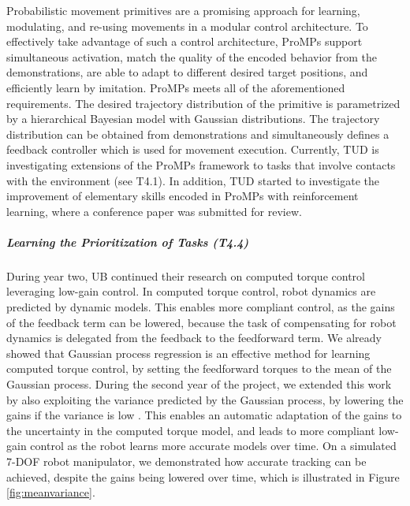 Probabilistic movement primitives are a promising approach for learning,
modulating, and re-using movements in a modular control architecture.  To
effectively take advantage of such a control architecture, ProMPs support
simultaneous activation, match the quality of the encoded behavior from the
demonstrations, are able to adapt to different desired target positions, and
efficiently learn by imitation. ProMPs meets all of the aforementioned
requirements.  The desired trajectory distribution of the
primitive is parametrized by a hierarchical Bayesian model with Gaussian distributions. The
trajectory distribution can be obtained from demonstrations and 
simultaneously defines a feedback controller which is used for movement
execution. Currently, TUD is investigating extensions of the ProMPs framework 
to tasks that involve 
contacts with the environment (see T4.1). In addition, TUD started to investigate the improvement of elementary skills encoded in ProMPs with 
reinforcement learning, where a conference paper was submitted for review.


\subparagraph{Learning the Prioritization of Tasks (T4.4)}%

During year two, UB continued their research on computed torque control leveraging low-gain control. 
In computed torque control, robot dynamics are predicted by dynamic models.
This enables more compliant control, as the gains of the feedback term can be
lowered, because the task of compensating for robot dynamics is delegated from
the feedback to the feedforward term.  We already showed that Gaussian process
regression is an effective method for learning computed torque control, by
setting the feedforward torques to the mean of the Gaussian process.  During
the second year of the project, we extended this work by also exploiting the
variance predicted by the Gaussian process, by lowering the gains if the
variance is low \cite{Albertoetal14}.  This enables an automatic adaptation of
the gains to the uncertainty in the computed torque model, and leads to more
compliant low-gain control as the robot learns more accurate models over time.
On a simulated 7-DOF robot manipulator, we demonstrated how accurate tracking
can be achieved, despite the gains being lowered over time, which is illustrated in Figure \ref{fig:meanvariance}.

